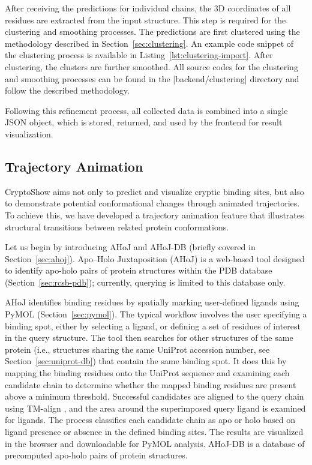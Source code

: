 After receiving the predictions for individual chains, the 3D coordinates of all residues are extracted from the input structure. This step is required for the clustering and smoothing processes. The predictions are first clustered using the methodology described in Section~\ref{sec:clustering}. An example code snippet of the clustering process is available in Listing~\ref{lst:clustering-import}. After clustering, the clusters are further smoothed. All source codes for the clustering and smoothing processes can be found in the \inline|backend/clustering| directory and follow the described methodology.



Following this refinement process, all collected data is combined into a single JSON object, which is stored, returned, and used by the frontend for result visualization.

\subsection{Trajectory Animation}
\label{sec:trajectory}

CryptoShow aims not only to predict and visualize cryptic binding sites, but also to demonstrate potential conformational changes through animated trajectories. To achieve this, we have developed a trajectory animation feature that illustrates structural transitions between related protein conformations.

Let us begin by introducing AHoJ \cite{feidakis2022ahoj} and AHoJ-DB \cite{feidakis2024ahoj} (briefly covered in Section~\ref{sec:ahoj}). Apo–Holo Juxtaposition (AHoJ) is a web-based tool designed to identify apo-holo pairs of protein structures within the PDB database (Section~\ref{sec:rcsb-pdb}); currently, querying is limited to this database only.

AHoJ identifies binding residues by spatially marking user-defined ligands using PyMOL (Section~\ref{sec:pymol}). The typical workflow involves the user specifying a binding spot, either by selecting a ligand, or defining a set of residues of interest in the query structure. The tool then searches for other structures of the same protein (i.e., structures sharing the same UniProt accession number, see Section~\ref{sec:uniprot-db}) that contain the same binding spot. It does this by mapping the binding residues onto the UniProt sequence and examining each candidate chain to determine whether the mapped binding residues are present above a minimum threshold. Successful candidates are aligned to the query chain using TM-align \cite{zhang2005tm}, and the area around the superimposed query ligand is examined for ligands. The process classifies each candidate chain as apo or holo based on ligand presence or absence in the defined binding sites. The results are visualized in the browser and downloadable for PyMOL analysis. AHoJ-DB is a database of precomputed apo-holo pairs of protein structures.

